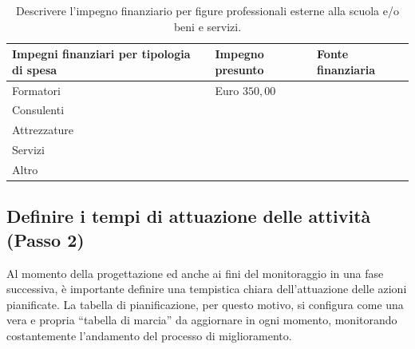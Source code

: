 \documentclass[12pt,a4paper,oneside]{memoir}
\begin{document}
\begin{table}[htp]
\caption{Descrivere l'impegno finanziario per figure professionali esterne alla scuola e/o beni e servizi.}  \label{descrivere-impegno-esterno}
\footnotesize
\begin{tabular}{|>{\raggedright}p{4.03092cm}|>{\raggedright}p{4.03092cm}|>{\raggedright\arraybackslash}p{4.03092cm}|}
\hline
\rowcolor{violetto}
Impegni finanziari per tipologia di spesa&Impegno presunto&Fonte finanziaria\\\hline
Formatori&Euro $350,00$&\\\hline
Consulenti&&\\\hline
Attrezzature&&\\\hline
Servizi&&\\\hline
Altro&&\\\hline
\end{tabular}
\end{table}

\clearpage

\subsection[Passo 2. Definire i tempi di attuazione]{Definire i tempi di attuazione delle attività (Passo 2)}

Al momento della progettazione ed anche ai fini del monitoraggio in una fase successiva, è importante definire una tempistica chiara dell'attuazione delle azioni pianificate. La tabella di pianificazione, per questo motivo, si configura come una vera e propria ``tabella di marcia'' da aggiornare in ogni momento, monitorando costantemente l'andamento del processo di miglioramento.\\
\end{document}

